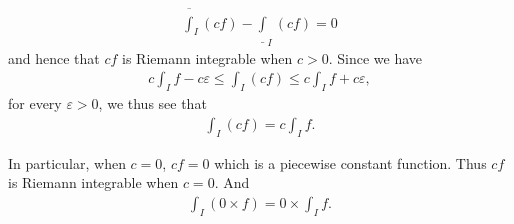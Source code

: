 \documentclass{book}
\begin{document}
\begin{enumerate}
        \begin{align*}
            \overline\int_{I}(cf)-\underline\int_{I}(cf)=0
        \end{align*}
    and hence that $cf$ is Riemann integrable when $c>0$. Since we have
        \begin{align*}
            c\int_{I}f-c\varepsilon
            \leq\int_{I}(cf)
            \leq c\int_{I}f+c\varepsilon,
        \end{align*}
    for every $\varepsilon>0$, we thus see that
        \begin{align*}
            \int_{I}(cf)=c\int_{I}f.
        \end{align*}

    In particular, when $c=0$, $cf=0$ which is a piecewise constant function. Thus $cf$ is Riemann integrable when $c=0$. And
        \begin{align*}
            \int_{I}(0\times f)=0\times\int_{I}f.
        \end{align*}


\end{enumerate}
\end{document}
